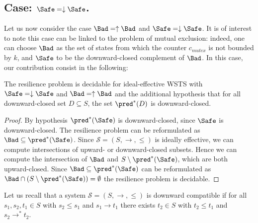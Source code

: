 

\subsection{Case: $\Safe=\downarrow \Safe$.}
%
%

Let us now consider the case $\Bad=\uparrow \Bad$ and $\Safe=\downarrow \Safe$.
It is of interest to note this case can be linked to the problem of mutual exclusion: indeed, one can choose $\Bad$ as the set of states from which the counter $c_{mutex}$ is not bounded by $k$, and $\Safe$ to be the downward-closed complement of $\Bad$. In this case, our contribution consist in the following:



%
\begin{theorem}\label{up-down}
The resilience problem is decidable for ideal-effective WSTS with 
$\Safe=\downarrow \Safe$
and $\Bad=\uparrow \Bad$
and
the additional hypothesis that
for all downward-closed set $D \subseteq S$, the set $\pred^*(D)$ is downward-closed.
\end{theorem}

\begin{proof}
By hypothesis $\pred^*(\Safe)$ is downward-closed, since $\Safe$ is downward-closed.
The resilience problem can be reformulated as 
$\Bad \subseteq  \pred^*(\Safe)$.
Since $\mathscr{S}=(S,\rightarrow, \leq)$ is ideally effective, we can compute intersections of upward- or downward-closed 
 subsets.
Hence we can compute the intersection of
$\Bad$
and
$S \setminus \pred^*(\Safe)$,
which are both upward-closed.
Since
$\Bad \subseteq \pred^*(\Safe)$
can be reformulated as
$\Bad \cap (S \setminus \pred^*(\Safe)) = \emptyset$
the resilience problem is decidable.
\end{proof}

Let us recall that a system $\mathscr{S}=(S,\rightarrow, \leq)$ is downward compatible if
for all $s_1, s_2, t_1 \in S$ with
$s_2 \leq s_1$ and $s_1 \to t_1$
there
exists $t_2 \in S$ with
$t_2 \leq t_1$ and $s_2 \to^* t_2$.

